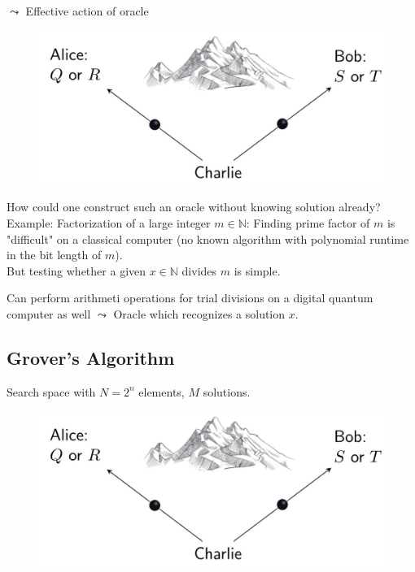 $\leadsto$ Effective action of oracle

\begin{figure}[H]
    \centering
    \includegraphics[scale=0.5]{chapters/res/alice-bob-charlie-mountain.png}
    \caption{}
\end{figure}


How could one construct such an oracle without knowing solution already? \\
Example: Factorization of a large integer $m \in \mathbb{N}$:
Finding prime factor of $m$ is "difficult" on a classical computer (no known algorithm with
polynomial runtime in the bit length of $m$). \\
But testing whether a given $x \in \mathbb{N}$ divides $m$ is simple.

Can perform arithmeti operations for trial divisions on a digital quantum computer as well
$\leadsto$ Oracle which recognizes a solution $x$.

\subsection{Grover's Algorithm}
Search space with $N = 2^n$ elements, $M$ solutions. 

\begin{figure}[H]
    \centering
    \includegraphics[scale=0.5]{chapters/res/alice-bob-charlie-mountain.png}
    \caption{}
\end{figure}

